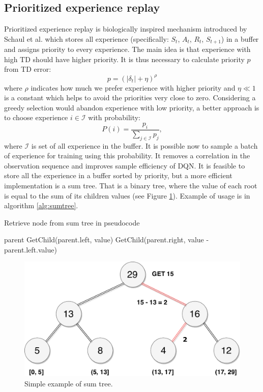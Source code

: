 \clearpage

\subsection{Prioritized experience replay}
Prioritized experience replay is biologically inspired mechanism introduced by Schaul et al. \cite{schaul2015} which stores all experience (specifically: $S_t$, $A_t$, $R_{t}$, $S_{t+1}$) in a buffer and assigns priority to every experience. The main idea is that experience with high TD should have higher priority. It is thus necessary to calculate priority $p$ from TD error:
\begin{equation}
p = (|\delta_t | + \eta)^\rho
\end{equation}
where $\rho$ indicates how much we prefer experience with higher priority and $\eta \ll 1$ is a constant which helps to avoid the priorities very close to zero. Considering a greedy selection would abandon experience with low priority, a better approach is to choose experience $i \in \mathcal{I}$ with probability:
\begin{equation}
P(i) = \frac{p_i}{\sum\limits_{j \in \mathcal{I}} p_j},
\end{equation}
where $\mathcal{I}$ is set of all experience in the buffer. It is possible now to sample a batch of experience for training using this probability. It removes a correlation in the observation sequence and improves sample efficiency of DQN. It is feasible to store all the experience in a buffer sorted by priority, but a more efficient implementation is a sum tree. That is a binary tree, where the value of each root is equal to the sum of its children values (see Figure \ref{fig:sumtree}). Example of usage is in algorithm \ref{alg:sumtree}.
\begin{algorithm}
\caption{Retrieve node from sum tree in pseudocode}
\label{alg:sumtree}
\begin{algorithmic}[1]
 \Return parent \EndIf
{} 
\State \Return GetChild(parent.left, value)
\Else 
\State \Return GetChild(parent.right, value - parent.left.value)
\EndIf
\EndFunction
\end{algorithmic}
\end{algorithm}
\begin{figure}[H]
\centering
\includegraphics[scale=0.5]{fig/sumtree.pdf}
\caption[Sum tree]{Simple example of sum tree.}
\label{fig:sumtree}
\end{figure}
\clearpage
